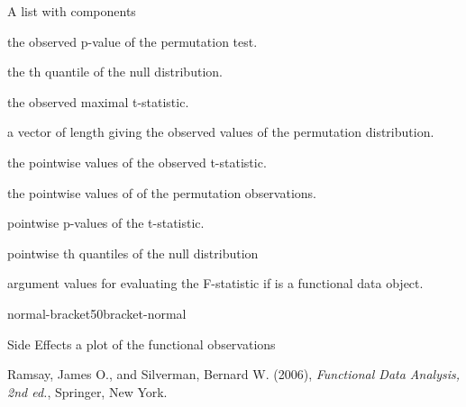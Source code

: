 \begin{Value}
A list with components
\begin{ldescription}
\item[\code{pval}] the observed p-value of the permutation test.
\item[\code{qval}] the th quantile of the null distribution.
\item[\code{Tobs}] the observed maximal t-statistic.
\item[\code{Tnull}] a vector of length  giving the observed values of the
permutation distribution.

\item[\code{Tvals}] the pointwise values of the observed t-statistic.
\item[\code{Tnullvals}] the pointwise values of of the permutation observations.
\item[\code{pvals.pts}] pointwise p-values of the t-statistic.
\item[\code{qvals.pts}] pointwise th quantiles of the null distribution
\item[\code{argvals}] argument values for evaluating the F-statistic if is
a functional data object.

\end{ldescription}

normal-bracket50bracket-normal
\end{Value}
\begin{Section}{Side Effects}
a plot of the functional observations
\end{Section}
\begin{Source}\relax
Ramsay, James O., and Silverman, Bernard W. (2006), \emph{Functional
Data Analysis, 2nd ed.}, Springer, New York.
\end{Source}
\begin{SeeAlso}\relax
{}
\end{SeeAlso}
\begin{Examples}
\end{Examples}

